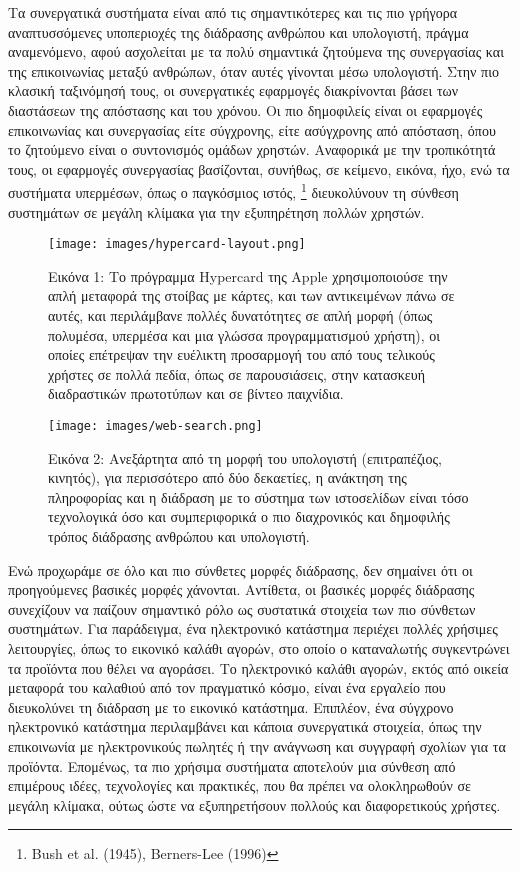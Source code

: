 \documentclass[
]{article}
\begin{document}
Τα συνεργατικά συστήματα είναι από τις σημαντικότερες και τις πιο
γρήγορα αναπτυσσόμενες υποπεριοχές της διάδρασης ανθρώπου και
υπολογιστή, πράγμα αναμενόμενο, αφού ασχολείται με τα πολύ σημαντικά
ζητούμενα της συνεργασίας και της επικοινωνίας μεταξύ ανθρώπων, όταν
αυτές γίνονται μέσω υπολογιστή. Στην πιο κλασική ταξινόμησή τους, οι
συνεργατικές εφαρμογές διακρίνονται βάσει των διαστάσεων της απόστασης
και του χρόνου. Οι πιο δημοφιλείς είναι οι εφαρμογές επικοινωνίας και
συνεργασίας είτε σύγχρονης, είτε ασύγχρονης από απόσταση, όπου το
ζητούμενο είναι ο συντονισμός ομάδων χρηστών. Αναφορικά με την
τροπικότητά τους, οι εφαρμογές συνεργασίας βασίζονται, συνήθως, σε
κείμενο, εικόνα, ήχο, ενώ τα συστήματα υπερμέσων, όπως ο παγκόσμιος
ιστός, \footnote{Bush et al. (1945), Berners-Lee (1996)} διευκολύνουν τη
σύνθεση συστημάτων σε μεγάλη κλίμακα για την εξυπηρέτηση πολλών χρηστών.

\leavevmode{}%
\begin{figure}
\hypertarget{fig:hypercard-layout}{%
\centering
\texttt{[image: images/hypercard-layout.png]}
\caption{Εικόνα 1: Το πρόγραμμα Hypercard της Apple χρησιμοποιούσε την
απλή μεταφορά της στοίβας με κάρτες, και των αντικειμένων πάνω σε αυτές,
και περιλάμβανε πολλές δυνατότητες σε απλή μορφή (όπως πολυμέσα,
υπερμέσα και μια γλώσσα προγραμματισμού χρήστη), οι οποίες επέτρεψαν την
ευέλικτη προσαρμογή του από τους τελικούς χρήστες σε πολλά πεδία, όπως
σε παρουσιάσεις, στην κατασκευή διαδραστικών πρωτοτύπων και σε βίντεο
παιχνίδια.}\label{fig:hypercard-layout}
}
\end{figure}

\leavevmode{}%
\begin{figure}
\hypertarget{fig:web-search}{%
\centering
\texttt{[image: images/web-search.png]}
\caption{Εικόνα 2: Ανεξάρτητα από τη μορφή του υπολογιστή (επιτραπέζιος,
κινητός), για περισσότερο από δύο δεκαετίες, η ανάκτηση της πληροφορίας
και η διάδραση με το σύστημα των ιστοσελίδων είναι τόσο τεχνολογικά όσο
και συμπεριφορικά ο πιο διαχρονικός και δημοφιλής τρόπος διάδρασης
ανθρώπου και υπολογιστή.}\label{fig:web-search}
}
\end{figure}

Ενώ προχωράμε σε όλο και πιο σύνθετες μορφές διάδρασης, δεν σημαίνει ότι
οι προηγούμενες βασικές μορφές χάνονται. Αντίθετα, οι βασικές μορφές
διάδρασης συνεχίζουν να παίζουν σημαντικό ρόλο ως συστατικά στοιχεία των
πιο σύνθετων συστημάτων. Για παράδειγμα, ένα ηλεκτρονικό κατάστημα
περιέχει πολλές χρήσιμες λειτουργίες, όπως το εικονικό καλάθι αγορών,
στο οποίο ο καταναλωτής συγκεντρώνει τα προϊόντα που θέλει να αγοράσει.
Το ηλεκτρονικό καλάθι αγορών, εκτός από οικεία μεταφορά του καλαθιού από
τον πραγματικό κόσμο, είναι ένα εργαλείο που διευκολύνει τη διάδραση με
το εικονικό κατάστημα. Επιπλέον, ένα σύγχρονο ηλεκτρονικό κατάστημα
περιλαμβάνει και κάποια συνεργατικά στοιχεία, όπως την επικοινωνία με
ηλεκτρονικούς πωλητές ή την ανάγνωση και συγγραφή σχολίων για τα
προϊόντα. Επομένως, τα πιο χρήσιμα συστήματα αποτελούν μια σύνθεση από
επιμέρους ιδέες, τεχνολογίες και πρακτικές, που θα πρέπει να
ολοκληρωθούν σε μεγάλη κλίμακα, ούτως ώστε να εξυπηρετήσουν πολλούς και
διαφορετικούς χρήστες.
\end{document}
